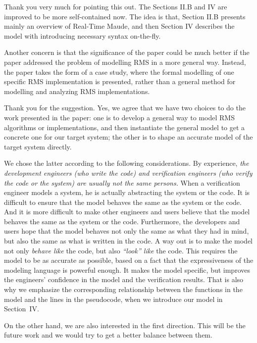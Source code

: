 \documentclass[10pt,journal]{IEEEtran}
\newcommand{\ANSWER}{\medskip\noindent{\bf RESPONSE: }}
\newcommand{\COMMENT}{\medskip\noindent{\bf COMMENT: }}
\begin{document}
\ANSWER 

Thank you very much for pointing this out. The Sections II.B and IV
are improved to be more self-contained now. The idea is that, Section
II.B presents mainly an overview of Real-Time Maude, and then Section
IV describes the model with introducing necessary syntax on-the-fly.

\COMMENT 

Another concern is that the significance of the paper could be much
better if the paper addressed the problem of modelling RMS in a more
general way. Instead, the paper takes the form of a case study, where
the formal modelling of one specific RMS implementation is presented,
rather than a general method for modelling and analyzing RMS
implementations.

\ANSWER 

Thank you for the suggestion. Yes, we agree that we have two choices
to do the work presented in the paper: one is to develop a general way
to model RMS algorithms or implementations, and then instantiate the
general model to get a concrete one for our target system; the other
is to shape an accurate model of the target system directly.

We chose the latter according to the following considerations. By
experience, \emph{the development engineers (who write the code) and
  verification engineers (who verify the code or the system) are
  usually not the same persons.} When a verification engineer models a
system, he is actually abstracting the system or the code. It is
difficult to ensure that the model behaves the same as the system or
the code.  And it is more difficult to make other engineers and users
believe that the model behaves the same as the system or the
code. Furthermore, the developers and users hope that the model
behaves not only the same as what they had in mind, but also the same
as what is written in the code. A way out is to make the model not
only \emph{behave like} the code, but also \emph{``look'' like} the
code. This requires the model to be as accurate as possible, based on
a fact that the expressiveness of the modeling language is powerful
enough. It makes the model specific, but improves the engineers'
confidence in the model and the verification results. That is also why
we emphasize the corresponding relationship between the functions in
the model and the lines in the pseudocode, when we introduce our model
in Section~IV.

On the other hand, we are also interested in the first direction. This
will be the future work and we would try to get a better balance
between them.
\end{document}
